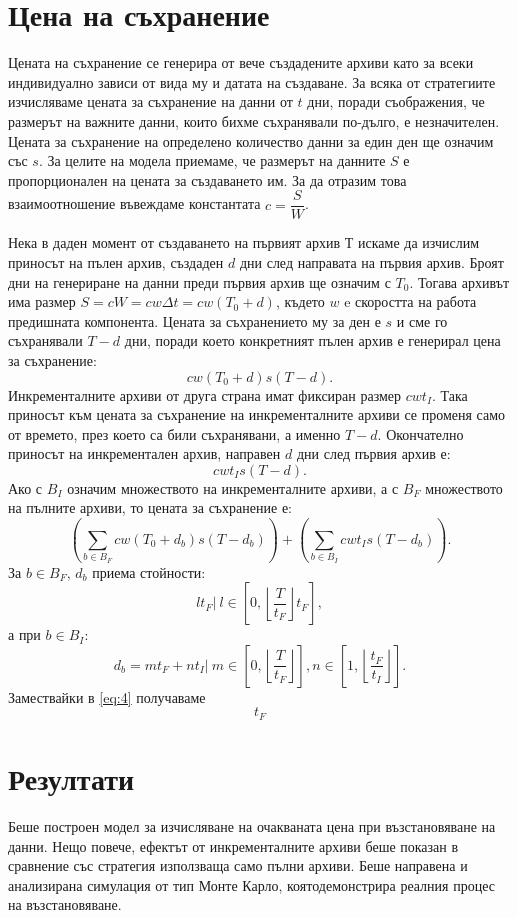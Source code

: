\documentclass[11pt, a4paper]{article}
\theoremstyle{definition}
\begin{document}
	\section{Цена на съхранение}
			Цената на съхранение се генерира от вече създадените архиви като за всеки индивидуално зависи от вида му и датата на създаване. За всяка от стратегиите изчисляваме цената за съхранение на данни от $t$ дни, поради съображения, че размерът на важните данни, които бихме съхранявали по-дълго, е незначителен. Цената за съхранение на определено количество  данни за един ден ще означим със $s$. За целите на модела приемаме, че размерът на данните $S$ е пропорционален на цената за създаването им. За да отразим това взаимоотношение въвеждаме константата $c = \dfrac{S}{W}$.\par
			Нека в даден момент от създаването на първият архив $Т$ искаме да изчислим приносът на пълен архив, създаден $d$ дни след направата на първия архив. Броят дни на генериране на данни преди първия архив ще означим с $T_0$. Тогава архивът има размер $S=cW=cw\Delta t=cw(T_0 + d)$, където $w$ e скоростта на работа предишната компонента. Цената за съхранението му за ден е $s$ и сме го съхранявали $T-d$ дни, поради което конкретният пълен архив е генерирал цена за съхранение:
			$$
				cw(T_0 + d)s(T-d).
			$$
			Инкременталните архиви от друга страна имат фиксиран размер $cwt_I$. Така приносът към цената за съхранение на инкременталните архиви се променя само от времето, през което са били съхранявани, а именно $T-d$. Окончателно приносът на инкрементален архив, направен $d$ дни след първия архив е: 
			$$
					cwt_Is(T-d).
			$$
			Ако с $B_I$ означим множеството на инкременталните архиви, а с $B_F$ множеството на пълните архиви, то цената за съхранение е:
			\begin{equation}\label{eq:4}
				\left(\displaystyle\sum_{b\in B_F}cw(T_0 + d_b)s(T-d_b)\right) + 	\left(\displaystyle\sum_{b\in B_I}cwt_Is(T-d_b)\right).
			\end{equation}
			За $b\in B_F$, $d_b$ приема стойности:
			$$lt_F|\ l\in \left[0,\left\lfloor\dfrac{T}{t_F}\right\rfloor t_F\right],$$
			а при $b\in  B_I$:
			$$d_b= mt_F + nt_I|\ m\in \left[0, \left\lfloor\dfrac{T}{t_F}\right\rfloor\right],n\in \left[1, \left\lfloor\dfrac{t_F}{t_I}\right\rfloor\right].$$
			Замествайки в \ref{eq:4} получаваме
			\begin{equation}
				t_F
			\end{equation}
	\section{Резултати}
			Беше построен модел за изчисляване на очакваната цена при възстановяване на данни. Нещо повече, ефектът от инкременталните архиви беше показан в сравнение със стратегия използваща само пълни архиви. Беше направена и анализирана симулация от тип Монте Карло, коятодемонстрира реалния процес на възстановяване.
\end{document}
